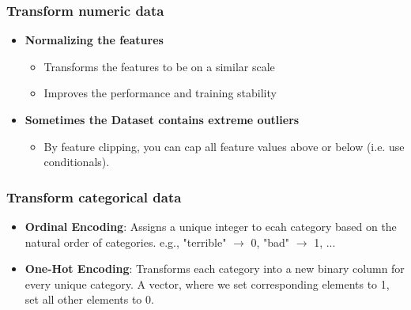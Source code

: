     \subsubsection{Transform numeric data}
    \begin{definition}
        \begin{itemize}
            \item \textbf{Normalizing the features}
            \begin{itemize}
                \item Transforms the features to be on a similar scale
                \item Improves the performance and training stability
            \end{itemize}
            
            \item \textbf{Sometimes the Dataset contains extreme outliers}
            \begin{itemize}
                \item By feature clipping, you can cap all feature values above or below (i.e. use conditionals).
            \end{itemize}
        \end{itemize}    
    \end{definition}
    
    \subsubsection{Transform categorical data}
    \begin{definition}
        \begin{itemize}
            \item \textbf{Ordinal Encoding}: Assigns a unique integer to ecah category based on the natural order of categories. e.g., "terrible" $\rightarrow$ 0, "bad" $\rightarrow$ 1, ...
            \item \textbf{One-Hot Encoding}: Transforms each category into a new binary column for every unique category. A vector, where we set corresponding elements to 1, set all other elements to 0.
        \end{itemize}
    \end{definition}

